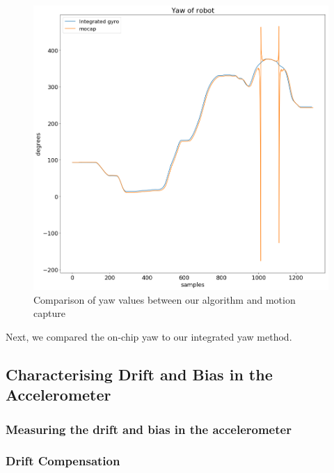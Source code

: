 \documentclass{article}
\begin{document}
    \begin{figure}[H]
      \centering
      \includegraphics[width=0.75\linewidth]{./images/yaw_mocap_versus_integration.png}
      \caption{Comparison of yaw values between our algorithm and motion capture}
      \label{fig:yaw_comparison}
    \end{figure}

    Next, we compared the on-chip yaw to our integrated yaw method. %


  \subsection{Characterising Drift and Bias in the Accelerometer}

    \subsubsection{Measuring the drift and bias in the accelerometer}


    \subsubsection{Drift Compensation}
\end{document}
